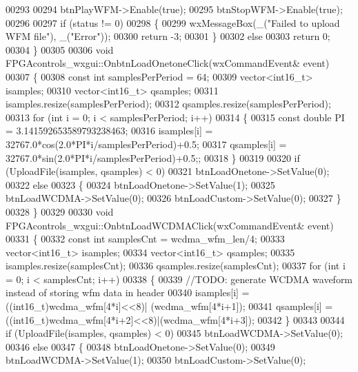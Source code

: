 \begin{DoxyCode}
{{00293 
00294     btnPlayWFM->Enable(\textcolor{keyword}{true});
00295     btnStopWFM->Enable(\textcolor{keyword}{true});
00296 
00297     \textcolor{keywordflow}{if} (status != 0)
00298     \{
00299         wxMessageBox(\_(\textcolor{stringliteral}{"Failed to upload WFM file"}), \_(\textcolor{stringliteral}{"Error"}));
00300         \textcolor{keywordflow}{return} -3;
00301     \}
00302     \textcolor{keywordflow}{else}
00303         \textcolor{keywordflow}{return} 0;
00304 \}
00305 
00306 \textcolor{keywordtype}{void} FPGAcontrols_wxgui::OnbtnLoadOnetoneClick(wxCommandEvent& event)
00307 \{
00308     \textcolor{keyword}{const} \textcolor{keywordtype}{int} samplesPerPeriod = 64;
00309     vector<int16\_t> isamples;
00310     vector<int16\_t> qsamples;
00311     isamples.resize(samplesPerPeriod);
00312     qsamples.resize(samplesPerPeriod);
00313     \textcolor{keywordflow}{for} (\textcolor{keywordtype}{int} i = 0; i < samplesPerPeriod; i++)
00314     \{
00315         \textcolor{keyword}{const} \textcolor{keywordtype}{double} PI  = 3.141592653589793238463;
00316         isamples[i] = 32767.0*cos(2.0*PI*i/samplesPerPeriod)+0.5;
00317         qsamples[i] = 32767.0*sin(2.0*PI*i/samplesPerPeriod)+0.5;;
00318     \}
00319 
00320     \textcolor{keywordflow}{if} (UploadFile(isamples, qsamples) < 0)
00321         btnLoadOnetone->SetValue(0);
00322     \textcolor{keywordflow}{else}
00323     \{
00324         btnLoadOnetone->SetValue(1);
00325         btnLoadWCDMA->SetValue(0);
00326         btnLoadCustom->SetValue(0);
00327     \}
00328 \}
00329 
00330 \textcolor{keywordtype}{void} FPGAcontrols_wxgui::OnbtnLoadWCDMAClick(wxCommandEvent& event)
00331 \{
00332     \textcolor{keyword}{const} \textcolor{keywordtype}{int} samplesCnt = wcdma_wfm_len/4;
00333     vector<int16\_t> isamples;
00334     vector<int16\_t> qsamples;
00335     isamples.resize(samplesCnt);
00336     qsamples.resize(samplesCnt);
00337     \textcolor{keywordflow}{for} (\textcolor{keywordtype}{int} i = 0; i < samplesCnt; i++)
00338     \{
00339         \textcolor{comment}{//TODO: generate WCDMA waveform instead of storing wfm data in header}
00340         isamples[i] = ((int16\_t)wcdma_wfm[4*i]<<8)| (wcdma_wfm[4*i+1]);
00341         qsamples[i] = ((int16\_t)wcdma_wfm[4*i+2]<<8)|(wcdma_wfm[4*i+3]);
00342     \}
00343 
00344     \textcolor{keywordflow}{if} (UploadFile(isamples, qsamples) < 0)
00345         btnLoadWCDMA->SetValue(0);
00346     \textcolor{keywordflow}{else}
00347     \{
00348         btnLoadOnetone->SetValue(0);
00349         btnLoadWCDMA->SetValue(1);
00350         btnLoadCustom->SetValue(0);
}}
\end{DoxyCode}

